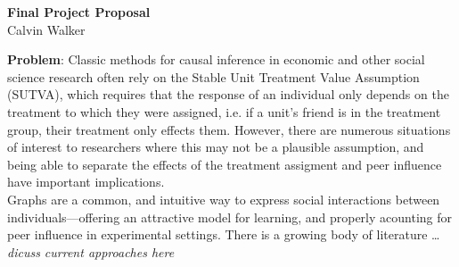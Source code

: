 \documentclass{article}
\begin{document}
\begin{center}
    \textbf{Final Project Proposal} \\[0.25ex]
    Calvin Walker
\end{center}
\textbf{Problem}: Classic methods for causal inference in economic and other social science research often rely on the Stable Unit Treatment Value Assumption (SUTVA), which requires that the response of an individual only depends on the treatment to which they were assigned, i.e. if a unit's friend is in the treatment group, their treatment only effects them. 
However, there are numerous situations of interest to researchers where this may not be a plausible assumption, and being able to separate the effects of the treatment assigment and peer influence have important implications. \\[0.5ex]
Graphs are a common, and intuitive way to express social interactions between individuals—offering an attractive model for learning, and properly acounting for peer influence in experimental settings. There is a growing body of literature \dots \textit{dicuss current approaches here} 
\end{document}
